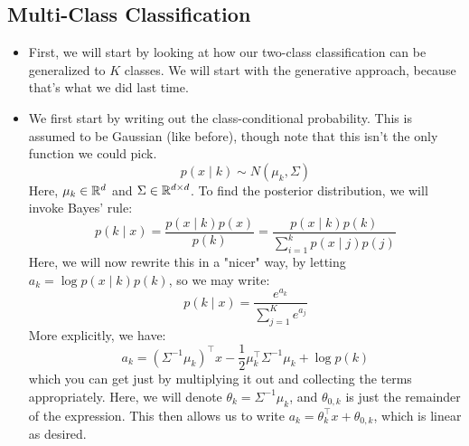 \subsection{Multi-Class Classification}
\begin{itemize}
	\item First, we will start by looking at how our two-class classification can be
		generalized to \( K \) classes. We will start with the generative approach,
		because that's what we did last time.  
	\item We first start by writing out the class-conditional probability. This is
		assumed to be Gaussian (like before), though note that this isn't the only
		function we could pick.
		\[
			p(x \mid k) \sim N(\mu_k, \Sigma)
		\]
		Here, \( \mu_k \in \mathbb R^{d} \) and \( \Sigma \in \mathbb R^{d \times d} \). To find
		the posterior distribution, we will invoke Bayes' rule:
		\[
			p(k \mid x) = \frac{p(x \mid k) p(x)}{p(k)} = \frac{p(x \mid k)
			p(k)}{\sum_{i = 1}^{k}p(x \mid j) p(j)}
		\]
		Here, we will now rewrite this in a "nicer" way, by letting \( a_k = \log p(x
		\mid k) p(k) \), so we may write:
		\[
			p(k \mid x) = \frac{e^{a_k}}{\sum_{j = 1}^{K}e^{a_j}}
		\]
		More explicitly, we have:
		\[
			a_k = (\Sigma^{-1} \mu_k)^{\top} x - \frac{1}{2}\mu_k^{\top} \Sigma^{-1}
			\mu_k + \log p(k)
		\]
		which you can get just by multiplying it out and collecting the terms
		appropriately. Here, we will denote \( \theta_k = \Sigma^{-1} \mu_k \), and \(
		\theta_{0, k} \) is just the remainder of the expression. This then allows us to
		write \( a_k = \theta_k^{\top} x + \theta_{0, k} \), which is linear as desired. 

\end{itemize}

